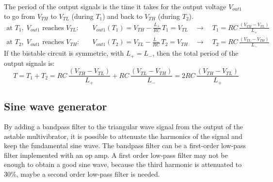 The period of the output signals is the time it takes for the output voltage \(V_{out1}\) to go from \(V_{TH}\) to \(V_{TL}\)
(during \(T_1\)) and back to \(V_{TH}\) (during \(T_2\)).
\begin{align*}
	\text{at } T_1, \; V_{out1} \text{ reaches } V_{TL}: \quad &V_{out1}(T_1) = V_{TH} - \frac{L_+}{RC} \, T_1 = V_{TL} \quad \rightarrow \quad T_1 = RC \, \frac{(V_{TH} - V_{TL})}{L_+} \\
	\text{at } T_2, \; V_{out1} \text{ reaches } V_{TH}: \quad &V_{out1}(T_2) = V_{TL} - \frac{L_-}{RC} \, T_2 = V_{TH} \quad \rightarrow \quad T_2 = RC \, \frac{(V_{TL} - V_{TH})}{L_-}
\end{align*}
If the bistable circuit is symmetric, with \(L_+ = L_-\), then the total period of the output signals is:
\[T = T_1 + T_2 = RC \, \frac{(V_{TH} - V_{TL})}{L_+} + RC \, \frac{(V_{TL} - V_{TH})}{L_-} = 2 RC \, \frac{(V_{TH} - V_{TL})}{L_+}\]

\newpage

\subsection{Sine wave generator}
By adding a bandpass filter to the triangular wave signal from the output of the astable multivibrator, it is possible to
attenuate the harmonics of the signal and keep the fundamental sine wave. The bandpass filter can be a first-order low-pass
filter implemented with an op amp. A first order low-pass filter may not be enough to obtain a good sine wave, because the third harmonic is
attenuated to 30\%, maybe a second order low-pass filter is needed.

